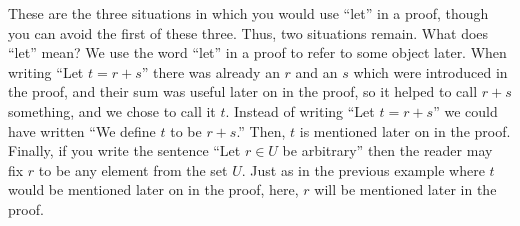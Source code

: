 \documentclass{book}
\theoremstyle{ekimcustom}
\begin{document}
These are the three situations in which you would use ``let'' in a proof, though you can avoid the first of these three. Thus, two situations remain. What does ``let'' mean? We use the word ``let'' in a proof to refer to some object later. When writing ``Let $t=r+s$'' there was already an $r$ and an $s$ which were introduced in the proof, and their sum was useful later on in the proof, so it helped to call $r+s$ something, and we chose to call it $t$. Instead of writing ``Let $t=r+s$'' we could have written ``We define $t$ to be $r+s$.'' Then, $t$ is mentioned later on in the proof. Finally, if you write the sentence ``Let $r \in U$ be arbitrary'' then the reader may fix $r$ to be any element from the set $U$. Just as in the previous example where $t$ would be mentioned later on in the proof, here, $r$ will be mentioned later in the proof.
\end{document}
